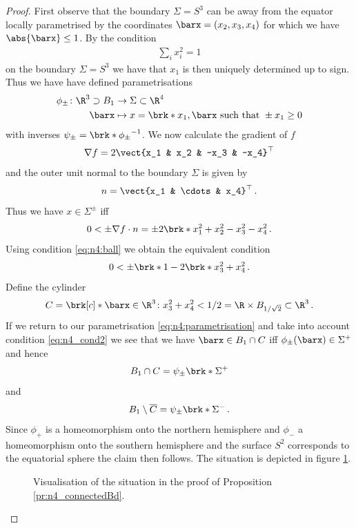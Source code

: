 \begin{proof}
  First observe that the boundary $\Sigma=S^3$ can be away from the equator locally parametrised by the coordinates $\barx = (x_2,x_3,x_4)$
  for which we have $\abs{\barx}\leq 1$. By the condition
  \begin{align}
    \sum_i x_i^2 = 1\label{eq:n4:ball}
  \end{align}
  on the boundary $\Sigma=S^3$ we have that $x_1$ is then uniquely determined up to sign.
  Thus we have have defined parametrisations
  \begin{align}
    \begin{aligned}\phi_\pm\colon \R^3\supset B_1&\to \Sigma\subset\R^4 \\
    \barx&\mapsto x=\brk*{x_1,\barx}\text{ such that } \pm x_1\geq0
    \end{aligned}\label{eq:n4:parametrisation}
  \end{align}
  with inverses $\psi_\pm = \brk*{\phi_\pm}^{-1}$.
  We now calculate the gradient of $f$
  \begin{align*}
    \nabla f = 2\vect{x_1 & x_2 & -x_3 & -x_4}^\top
  \end{align*}
  and the outer unit normal to the boundary $\Sigma$ is given by
  \begin{align*}
    n = \vect{x_1 & \cdots & x_4}^\top\,.
  \end{align*}
  Thus we have $x\in\Sigma^\pm$ iff
  \begin{align*}
    0<\pm \nabla f\cdot n = \pm 2\brk*{x_1^2+x_2^2-x_3^2-x_4^2}\,.
  \end{align*}
  Using condition \eqref{eq:n4:ball} we obtain the equivalent condition
  \begin{align}
	  0<\pm \brk*{1-2\brk*{x_3^2+x_4^2}}\,.\label{eq:n4_cond2}
  \end{align}
  Define the cylinder
  \begin{align*}
    C = \brk[c]*{\barx\in \R^3\colon x_3^2+x_4^2<1/2} = \R\times B_{1/\sqrt{2}}\subset\R^3\,.
  \end{align*}
  If we return to our parametrisation \eqref{eq:n4:parametrisation} and take into account condition \eqref{eq:n4_cond2} we see that we have $\barx\in B_1\cap C$ iff
  $\phi_\pm(\barx)\in \Sigma^+$ and hence 
  \begin{align*}
    B_1\cap C=\psi_\pm\brk*{\Sigma^+}
  \end{align*}
  and 
  \begin{align*}
	  B_1\setminus \overline{C}=\psi_\pm\brk*{\Sigma^-}\,.
  \end{align*}
  Since $\phi_+$ is a homeomorphism onto the northern hemisphere and
  $\phi_-$ a homeomorphism onto the southern hemisphere and the surface $S^2$
  corresponds to the equatorial sphere the claim then follows.
  The situation is depicted in figure \ref{fi:n4_sigma}.
  \begin{figure}[h]
    \centering
    \def\svgwidth{0.8\textwidth}
    
    \caption{Visualisation of the situation in the proof of Proposition \ref{pr:n4_connectedBd}.}
    \label{fi:n4_sigma}
  \end{figure}
\end{proof}



